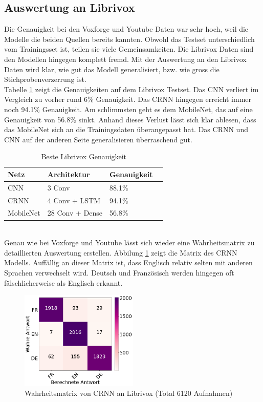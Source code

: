 \subsection{Auswertung an Librivox}
Die Genauigkeit bei den Voxforge und Youtube Daten war sehr hoch, weil die Modelle die beiden Quellen bereits kannten. Obwohl das Testset unterschiedlich vom Trainingsset ist,  teilen sie viele Gemeinsamkeiten. Die Librivox Daten sind den Modellen hingegen komplett fremd. Mit der Auswertung an den Librivox Daten wird klar, wie gut das Modell generalisiert, bzw. wie gross die Stichprobenverzerrung ist.
\\
Tabelle \ref{table:test_lib} zeigt die Genauigkeiten auf dem Librivox Testset. Das CNN verliert im Vergleich zu vorher rund 6\% Genauigkeit. Das CRNN hingegen erreicht immer noch 94.1\% Genauigkeit. Am schlimmsten geht es dem MobileNet, das auf eine Genauigkeit von 56.8\% sinkt. Anhand dieses Verlust lässt sich klar ablesen, dass das MobileNet sich an die Trainingsdaten überangepasst hat. Das CRNN und CNN auf der anderen Seite generalisieren überraschend gut.
\begin{table}[h]
	\centering
	\begin{tabular}{llll}
		\hline
		Netz & Architektur     & Genauigkeit  \\ \hline
		CNN  & 3 Conv          & 88.1\%       \\
		CRNN & 4 Conv + LSTM   & 94.1\%       \\
		MobileNet  & 28 Conv + Dense & 56.8\%       \\ \hline
	\end{tabular}
	\caption{Beste Librivox Genauigkeit}
	\label{table:test_lib}
\end{table}
\\
Genau wie bei Voxforge und Youtube lässt sich wieder eine Wahrheitsmatrix zu detaillierten Auswertung erstellen. Abbilung \ref{img:matrix_lib} zeigt die Matrix des CRNN Modells. Auffällig an dieser Matrix ist, dass Englisch relativ selten mit anderen Sprachen verwechselt wird. Deutsch und Französisch werden hingegen oft fälschlicherweise als Englisch erkannt. 
\begin{figure}[hbt]
	\centering
		\includegraphics[width=0.5\textwidth]{assets/matrix_lib_crnn.png}
	\caption{Wahrheitsmatrix von CRNN an Librivox (Total 6120 Aufnahmen)}
	\label{img:matrix_lib}
\end{figure}
